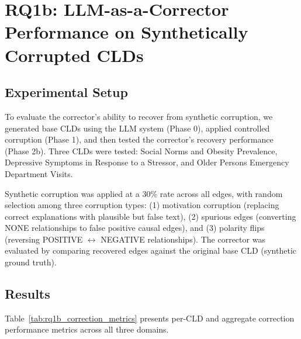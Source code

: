 \section{RQ1b: LLM-as-a-Corrector Performance on Synthetically Corrupted CLDs}

\subsection{Experimental Setup}

To evaluate the corrector's ability to recover from synthetic corruption, we generated base CLDs using the LLM system (Phase 0), applied controlled corruption (Phase 1), and then tested the corrector's recovery performance (Phase 2b). Three CLDs were tested: Social Norms and Obesity Prevalence, Depressive Symptoms in Response to a Stressor, and Older Persons Emergency Department Visits.

Synthetic corruption was applied at a 30\% rate across all edges, with random selection among three corruption types: (1) motivation corruption (replacing correct explanations with plausible but false text), (2) spurious edges (converting NONE relationships to false positive causal edges), and (3) polarity flips (reversing POSITIVE $\leftrightarrow$ NEGATIVE relationships). The corrector was evaluated by comparing recovered edges against the original base CLD (synthetic ground truth).

\subsection{Results}

Table~\ref{tab:rq1b_correction_metrics} presents per-CLD and aggregate correction performance metrics across all three domains.

